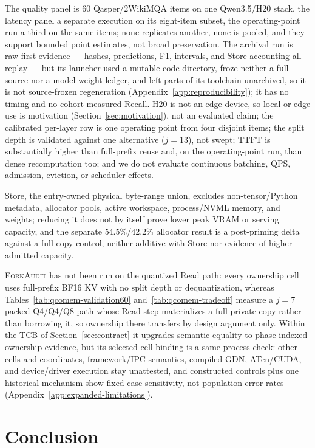 \documentclass{article}
\newcommand{\method}{\textsc{ForkAudit}}
\begin{document}
The quality panel is 60 Qasper/2WikiMQA items on one Qwen3.5/H20 stack, the
latency panel a separate execution on its eight-item subset, the operating-point run a third on
the same items; none replicates another, none is pooled, and they support
bounded point estimates, not broad preservation. The archival run is raw-first
evidence --- hashes, predictions, F1, intervals, and Store accounting all replay
--- but its launcher used a mutable code directory, froze neither a full-source
nor a model-weight ledger, and left parts of its toolchain unarchived, so it is
not source-frozen regeneration (Appendix~\ref{app:reproducibility}); it has no
timing and no cohort measured Recall. H20 is not an edge device, so local or edge use is
motivation (Section~\ref{sec:motivation}), not an evaluated claim; the calibrated per-layer row is one operating point from four disjoint
items; the split depth is validated against one alternative ($j=13$), not swept;
TTFT is substantially higher than full-prefix reuse and, on the operating-point
run, than dense recomputation too; and we do not evaluate continuous batching,
QPS, admission, eviction, or scheduler effects.

Store, the entry-owned physical byte-range union, excludes non-tensor/Python
metadata, allocator pools, active workspace, process/NVML memory, and weights;
reducing it does not by itself prove lower peak VRAM or serving capacity, and
the separate $54.5\%$/$42.2\%$ allocator result is a post-priming delta against
a full-copy control, neither additive with Store nor evidence of higher admitted
capacity.

\method{} has not been run on the quantized Read path: every ownership cell uses
full-prefix BF16 KV with no split depth or dequantization, whereas
Tables~\ref{tab:qcomem-validation60} and~\ref{tab:qcomem-tradeoff} measure a
$j=7$ packed Q4/Q4/Q8 path whose Read step materializes a full private copy
rather than
borrowing it, so ownership there transfers by design argument only.  Within the
TCB of Section~\ref{sec:contract} it upgrades semantic equality to
phase-indexed ownership evidence, but its selected-cell binding is a
same-process check: other cells and coordinates,
framework/IPC semantics, compiled GDN, ATen/CUDA, and device/driver execution
stay unattested, and constructed controls plus one historical mechanism show
fixed-case sensitivity, not population error rates
(Appendix~\ref{app:expanded-limitations}).

\FloatBarrier

\section{Conclusion}
\end{document}
